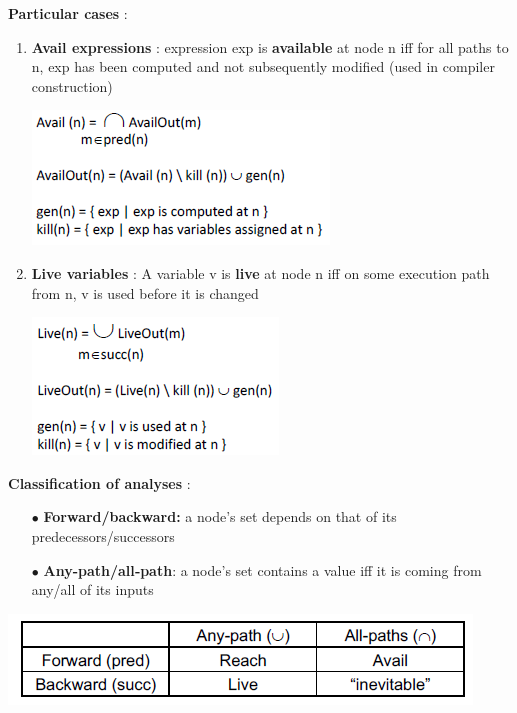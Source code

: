 \documentclass{article}
\begin{document}
\vspace{-0.5cm}
\noindent \textbf{Particular cases} :
\begin{enumerate}
    \item \textbf{Avail expressions} : expression exp is \textbf{available} at node n iff for all paths to n, exp has been computed and not subsequently modified (used in compiler construction)
\begin{center}
        \includegraphics[scale = 0.7]{image/14.PNG}
\end{center}
    \item \textbf{Live variables} : A variable v is \textbf{live} at node n iff on some execution path from n, v is used before it is changed
\begin{center}
        \includegraphics[scale = 0.7]{image/15.PNG}
\end{center}
\end{enumerate}
\vspace{-0.5cm}
\noindent \textbf{Classification of
analyses} :
\begin{itemize}
    \item [$\bullet$]\textbf{Forward/backward:}
a
node’s set
depends on
that of
its
predecessors/successors
    \item [$\bullet$]\textbf{Any-path/all‐path}:
a
node’s set
contains a
value iff it is coming
from
any/all of
its inputs
\end{itemize}
\begin{center}
        \includegraphics[scale = 0.6]{image/16.PNG}
\end{center}
\end{document}
